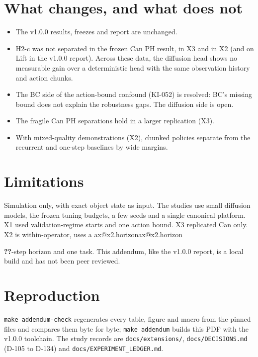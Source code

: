 \documentclass[10pt,a4paper]{article}
\makeatletter
\newcommand{\ax}[1]{\ifcsname ax@#1\endcsname\csname ax@#1\endcsname\else
  \PackageError{roboforge}{Undefined addendum key #1}{Run make addendum-assets}\textbf{??}\fi}
\newcommand{\file}[1]{\nolinkurl{#1}}
\makeatother
\begin{document}
\section{What changes, and what does not}
\begin{itemize}
\item The v1.0.0 results, freezes and report are unchanged.
\item H2-c was not separated in the frozen Can PH result, in X3 and in X2 (and on Lift in the
  v1.0.0 report). Across these data, the diffusion head shows no measurable gain over a
  deterministic head with the same observation history and action chunks.
\item The BC side of the action-bound confound (KI-052) is resolved: BC's missing bound does
  not explain the robustness gaps. The diffusion side is open.
\item The fragile Can PH separations hold in a larger replication (X3).
\item With mixed-quality demonstrations (X2), chunked policies separate from the recurrent and
  one-step baselines by wide margins.
\end{itemize}

\section{Limitations}
Simulation only, with exact object state as input. The studies use small diffusion models,
the frozen tuning budgets, a few seeds and a single canonical platform. X1 used validation-regime
starts and one action bound. X3 replicated Can only. X2 is within-operator, uses a
\ax{x2.horizon}-step horizon and one task. This addendum, like the v1.0.0 report, is a local
build and has not been peer reviewed.

\section*{Reproduction}
\file{make addendum-check} regenerates every table, figure and macro from the pinned files and
compares them byte for byte; \file{make addendum} builds this PDF with the v1.0.0 toolchain.
The study records are \file{docs/extensions/}, \file{docs/DECISIONS.md} (D-105 to D-134) and
\file{docs/EXPERIMENT_LEDGER.md}.



\end{document}

